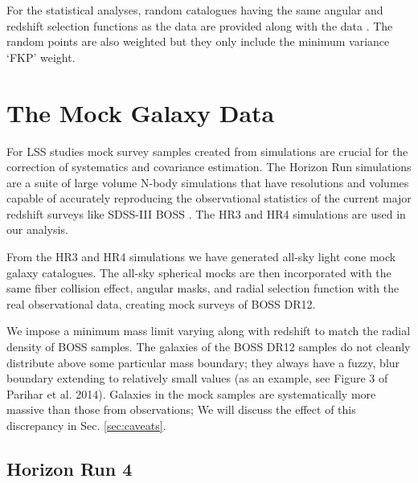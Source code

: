 \documentclass[iop]{emulateapj}
\begin{document}
For the statistical analyses, 
random catalogues having the same angular and redshift selection functions as the data 
are provided along with the data \citep{Reidetal:2016}.
The random points are also weighted but they only include the minimum variance `FKP' weight. 




\section{The Mock Galaxy Data}
\label{sec:mocks}


For LSS studies mock survey samples created from simulations are crucial
for the correction of systematics and covariance estimation.
The Horizon Run simulations are a suite of large volume N-body simulations that 
have resolutions and volumes capable of accurately reproducing the observational statistics of the current major redshift surveys like 
SDSS-III BOSS \citep{park 2005,2009ApJ...701.1547K,horizonrun}.
The HR3 \citep{horizonrun} and HR4 \citep{hr4} simulations are used in our analysis.

From the HR3 and HR4 simulations we have generated all-sky light cone mock galaxy catalogues.
The all-sky spherical mocks are then incorporated with the same fiber collision effect, 
angular masks, and radial selection function with the real observational data,
creating mock surveys of BOSS DR12.

We impose a minimum mass limit varying along with redshift to match the radial density of BOSS samples.
The galaxies of the BOSS DR12 samples do not cleanly distribute above some particular mass boundary;
they always have a fuzzy, blur boundary extending to relatively small values (as an example, see Figure 3 of 
Parihar et al. 2014). %
Galaxies in the mock samples are systematically more massive than those from observations;
We will discuss the effect of this discrepancy in Sec. \ref{sec:caveats}.


\subsection{Horizon Run 4}
\end{document}
